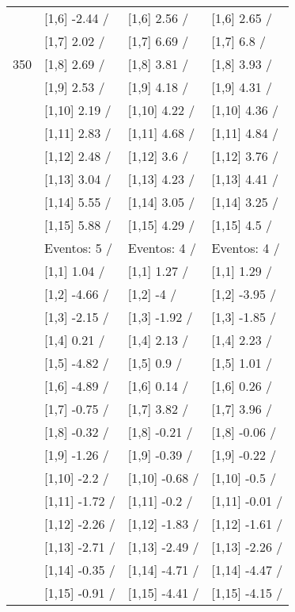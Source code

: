 \begin{table}
\begin{tabular}[t]{llll}
 & {}[1,6] -2.44  / & {}[1,6] 2.56  / & {}[1,6] 2.65  /\\
 & {}[1,7] 2.02  / & {}[1,7] 6.69  / & {}[1,7] 6.8  /\\
350 & {}[1,8] 2.69  / & {}[1,8] 3.81  / & {}[1,8] 3.93  /\\
\addlinespace
 & {}[1,9] 2.53  / & {}[1,9] 4.18  / & {}[1,9] 4.31  /\\
 & {}[1,10] 2.19  / & {}[1,10] 4.22  / & {}[1,10] 4.36  /\\
 & {}[1,11] 2.83  / & {}[1,11] 4.68  / & {}[1,11] 4.84  /\\
 & {}[1,12] 2.48  / & {}[1,12] 3.6  / & {}[1,12] 3.76  /\\
 & {}[1,13] 3.04  / & {}[1,13] 4.23  / & {}[1,13] 4.41  /\\
\addlinespace
 & {}[1,14] 5.55  / & {}[1,14] 3.05  / & {}[1,14] 3.25  /\\
 & {}[1,15] 5.88  / & {}[1,15] 4.29  / & {}[1,15] 4.5  /\\
 & Eventos:  5 / & Eventos:  4 / & Eventos:  4 /\\
 & {}[1,1] 1.04  / & {}[1,1] 1.27  / & {}[1,1] 1.29  /\\
 & {}[1,2] -4.66  / & {}[1,2] -4  / & {}[1,2] -3.95  /\\
\addlinespace
 & {}[1,3] -2.15  / & {}[1,3] -1.92  / & {}[1,3] -1.85  /\\
 & {}[1,4] 0.21  / & {}[1,4] 2.13  / & {}[1,4] 2.23  /\\
 & {}[1,5] -4.82  / & {}[1,5] 0.9  / & {}[1,5] 1.01  /\\
 & {}[1,6] -4.89  / & {}[1,6] 0.14  / & {}[1,6] 0.26  /\\
 & {}[1,7] -0.75  / & {}[1,7] 3.82  / & {}[1,7] 3.96  /\\
\addlinespace
500 & {}[1,8] -0.32  / & {}[1,8] -0.21  / & {}[1,8] -0.06  /\\
 & {}[1,9] -1.26  / & {}[1,9] -0.39  / & {}[1,9] -0.22  /\\
 & {}[1,10] -2.2  / & {}[1,10] -0.68  / & {}[1,10] -0.5  /\\
 & {}[1,11] -1.72  / & {}[1,11] -0.2  / & {}[1,11] -0.01  /\\
 & {}[1,12] -2.26  / & {}[1,12] -1.83  / & {}[1,12] -1.61  /\\
\addlinespace
 & {}[1,13] -2.71  / & {}[1,13] -2.49  / & {}[1,13] -2.26  /\\
 & {}[1,14] -0.35  / & {}[1,14] -4.71  / & {}[1,14] -4.47  /\\
 & {}[1,15] -0.91  / & {}[1,15] -4.41  / & {}[1,15] -4.15  /\\
\bottomrule
\end{tabular}
\end{table}
